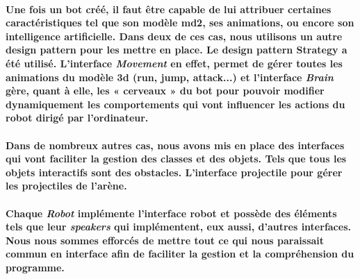\paragraph{Une fois un bot créé, il faut être capable de lui attribuer certaines caractéristiques tel que son modèle md2, ses animations, ou encore son intelligence artificielle. Dans deux de ces cas, nous utilisons un autre design pattern pour les mettre en place. Le design pattern \textbf{Strategy} a été utilisé. L'interface \textit{Movement} en effet, permet de gérer toutes les animations du modèle 3d (run, jump, attack...) et l'interface \textit{Brain} gère, quant à elle, les « cerveaux » du bot pour pouvoir modifier dynamiquement les comportements qui vont influencer les actions du robot dirigé par l'ordinateur.}
	
\paragraph{Dans de nombreux autres cas, nous avons mis en place des interfaces qui vont faciliter la gestion des classes et des objets. Tels que tous les objets interactifs sont des obstacles. L'interface projectile pour gérer les projectiles de l'arène.}

\paragraph{Chaque \textit{Robot} implémente l'interface robot et possède des éléments tels que leur \textit{speakers} qui implémentent, eux aussi, d'autres interfaces. Nous nous sommes efforcés de mettre tout ce qui nous paraissait commun en interface afin de faciliter la gestion et la compréhension du programme.}



\newpage
